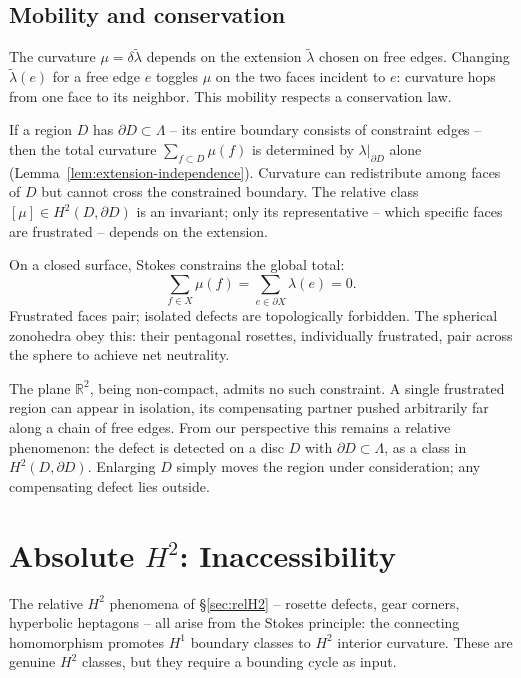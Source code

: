\documentclass[11pt]{amsart}  %
\theoremstyle{plain}
\theoremstyle{definition}
\theoremstyle{remark}
\newcommand{\coboundary}{\delta} %
\newcommand{\R}{\mathbb{R}} %
\newcommand{\cgraph}{\Lambda} %
\newcommand{\coupling}{\lambda} %
\begin{document}
\subsection{Mobility and conservation}
\label{sec:curvature-conservation}

The curvature $\mu = \coboundary\tilde\coupling$ depends on the extension $\tilde\coupling$ chosen on free edges. Changing $\tilde\coupling(e)$ for a free edge $e$ toggles $\mu$ on the two faces incident to $e$: curvature hops from one face to its neighbor. This mobility respects a conservation law.

If a region $D$ has $\partial D \subset \cgraph$ -- its entire boundary consists of constraint edges -- then the total curvature $\sum_{f \subset D} \mu(f)$ is determined by $\coupling|_{\partial D}$ alone (Lemma~\ref{lem:extension-independence}). Curvature can redistribute among faces of $D$ but cannot cross the constrained boundary. The relative class $[\mu] \in H^2(D, \partial D)$ is an invariant; only its representative -- which specific faces are frustrated -- depends on the extension.

On a closed surface, Stokes constrains the global total:
\[
\sum_{f \in X} \mu(f) = \sum_{e \in \partial X} \coupling(e) = 0.
\]
Frustrated faces pair; isolated defects are topologically forbidden. The spherical zonohedra obey this: their pentagonal rosettes, individually frustrated, pair across the sphere to achieve net neutrality.

The plane $\R^2$, being non-compact, admits no such constraint. A single frustrated region can appear in isolation, its compensating partner pushed arbitrarily far along a chain of free edges. From our perspective this remains a relative phenomenon: the defect is detected on a disc $D$ with $\partial D \subset \cgraph$, as a class in $H^2(D, \partial D)$. Enlarging $D$ simply moves the region under consideration; any compensating defect lies outside.


\section{Absolute $H^2$: Inaccessibility}
\label{sec:absH2}

The relative $H^2$ phenomena of \S\ref{sec:relH2} -- rosette defects, gear corners, 
hyperbolic heptagons -- all arise from the Stokes principle: the connecting 
homomorphism promotes $H^1$ boundary classes to $H^2$ interior curvature. 
These are genuine $H^2$ classes, but they require a bounding cycle as input.
\end{document}
